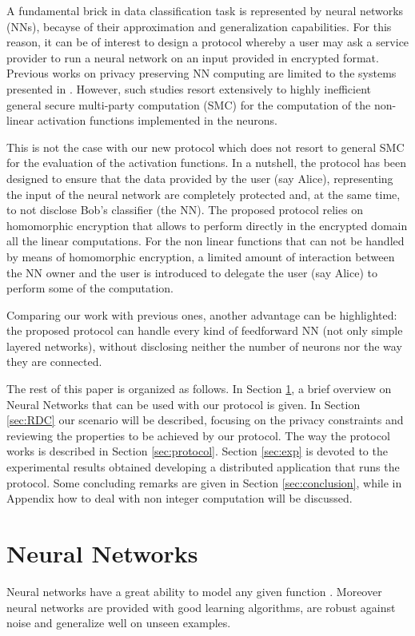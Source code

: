 \documentclass[11pt,oribibl,runningheads]{llncs}
\begin{document}
A fundamental brick in data classification task is represented by
neural networks (NNs), becayse of their approximation and
generalization capabilities. For this reason, it can be of interest to
design a protocol whereby a user may ask a service provider to
run a neural network on an input provided in encrypted format.
Previous works on privacy preserving NN computing are limited to
the systems presented in \cite{ppnn,chang2005ope}. However, such
studies resort extensively to highly inefficient general secure
multi-party computation (SMC) \cite{Yao86} for
the computation of the non-linear activation functions implemented
in the neurons.

This is not the case with our new protocol which does not resort
to general SMC for the evaluation of the activation functions. In
a nutshell, the protocol has been designed to ensure that the data
provided by the user (say Alice), representing the input of the
neural network are completely protected and, at the same time, to
not disclose Bob's classifier (the NN). The proposed protocol relies on homomorphic encryption
that allows to perform directly in the encrypted domain all the
linear computations. For the non linear functions that can not be
handled by means of homomorphic encryption, a limited amount of
interaction between the NN owner and the user is introduced to
delegate the user (say Alice) to perform some of the computation.

Comparing our work with previous ones, another advantage can be
highlighted: the proposed protocol can handle every kind of
feedforward NN (not only simple layered networks), without
disclosing neither the number of neurons nor the way they are
connected.

The rest of this paper is organized as follows. In Section
\ref{sec.NN}, a brief overview on Neural Networks that can be used
with our protocol is given. In Section
\ref{sec:RDC} our scenario will be described, focusing on the
privacy constraints and reviewing the properties to be achieved
by our protocol. The way the protocol works is described in
Section \ref{sec:protocol}. Section \ref{sec:exp} is devoted to
the experimental results obtained developing a distributed
application that runs the protocol. Some concluding remarks are
given in Section \ref{sec:conclusion}, while in Appendix how to deal with non integer computation will be
discussed.

\section{Neural Networks}
\label{sec.NN} Neural networks have a great
ability to model any given function \cite{lapedes1988nnw,70408}. Moreover neural networks
are provided with good learning algorithms, are robust
against noise and generalize well on unseen examples.
\end{document}
